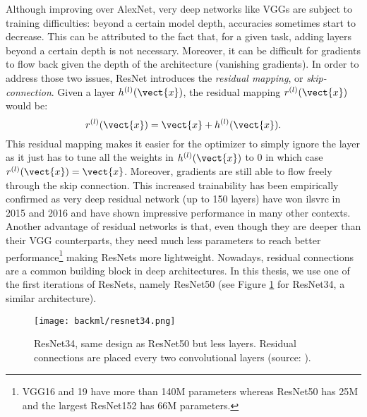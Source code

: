 Although improving over AlexNet, very deep networks like VGGs are subject to
training difficulties: beyond a certain model depth, accuracies sometimes start
to decrease. This can be attributed to the fact that, for a given task, adding
layers beyond a certain depth is not necessary. Moreover, it can be difficult for
gradients to flow back given the depth of the architecture (\ie vanishing gradients).
In order to address those two issues, ResNet \cite{he2016deep} introduces
the \textit{residual mapping}, or \textit{skip-connection}. Given a layer
$h^{(l)}(\vect{x})$, the residual mapping $r^{(l)}(\vect{x})$ would be:
\begin{equation}
\label{eqn:backml:residual}
r^{(l)}(\vect{x}) = \vect{x} + h^{(l)}(\vect{x}).
\end{equation}
This residual mapping makes it easier for the optimizer to simply ignore the layer
as it just has to tune all the weights in $h^{(l)}(\vect{x})$ to 0 in which case
$r^{(l)}(\vect{x}) = \vect{x}$. Moreover, gradients are still able to flow freely
through the skip connection. This increased trainability has been empirically
confirmed as very deep residual network (up to 150 layers) have won \acrshort{ilsvrc}
in 2015 and 2016 and have shown impressive performance in many other contexts.
Another advantage of residual networks is that, even though they are deeper than
their VGG counterparts, they need much less parameters to reach better
performance\footnote{VGG16 and 19 have more than 140M parameters whereas ResNet50 has 25M and the largest ResNet152 has 66M parameters.}
making ResNets more lightweight. Nowadays, residual connections are a common
building block in deep architectures. In this thesis, we use one of the first
iterations of ResNets, namely ResNet50 (see Figure \ref{fig:backml:resnet} for
ResNet34, a similar architecture).

\begin{figure}
  \centering
  \texttt{[image: backml/resnet34.png]}
  \caption{ResNet34, same design as ResNet50 but less layers. Residual connections are placed every two convolutional layers (source: \cite{he2016deep}).}
  \label{fig:backml:resnet}
\end{figure}

